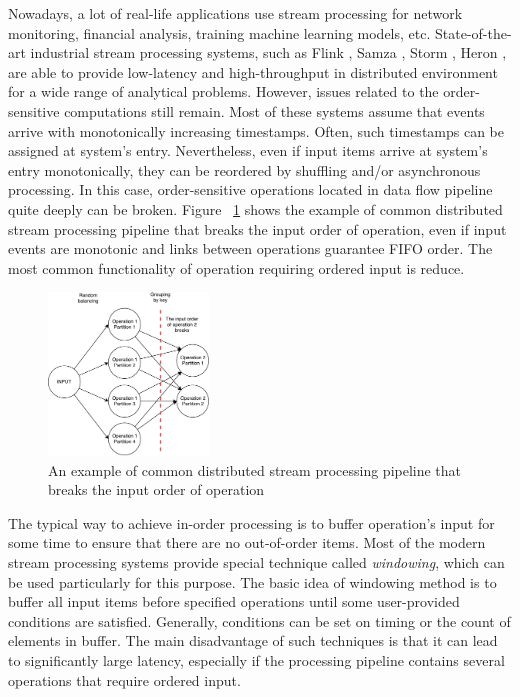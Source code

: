 
\label {fs-intro}

Nowadays, a lot of real-life applications use stream processing for network monitoring, financial analysis, training machine learning models, etc. State-of-the-art industrial stream processing systems, such as Flink \cite{carbone2015apache}, Samza \cite{Noghabi:2017:SSS:3137765.3137770}, Storm \cite{apache:storm}, Heron \cite{Kulkarni:2015:THS:2723372.2742788}, are able to provide low-latency and high-throughput in distributed environment for a wide range of analytical problems. However, issues related to the order-sensitive computations still remain. Most of these  systems assume that events arrive with monotonically increasing timestamps. Often, such timestamps can be assigned at system's entry. Nevertheless, even if input items arrive at system's entry monotonically, they can be reordered by shuffling and/or asynchronous processing. In this case, order-sensitive operations located in data flow pipeline quite deeply can be broken. Figure ~\ref{break-order-dataflow} shows the example of common distributed stream processing pipeline that breaks the input order of operation, even if input events are monotonic and links between operations guarantee FIFO order. The most common functionality of operation requiring ordered input is reduce. 

\begin{figure}[htbp]
  \centering
  \includegraphics[width=0.38\textwidth]{pics/break_order_pipeline}
  \caption{An  example of common distributed stream processing pipeline that breaks the input order of operation}
  \label {break-order-dataflow}
\end{figure}

The typical way to achieve in-order processing is to buffer operation's input for some time to ensure that there are no out-of-order items. Most of the modern stream processing systems provide special technique called {\it windowing}, which can be used particularly for this purpose. The basic idea of windowing method is to buffer all input items before specified operations until some user-provided conditions are satisfied. Generally, conditions can be set on timing or the count of elements in buffer. The main disadvantage of such techniques is that it can lead to significantly large latency, especially if the processing pipeline contains several operations that require ordered input. 

